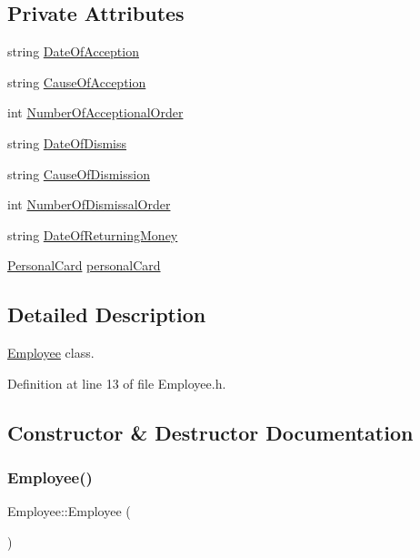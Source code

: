 \subsection*{Private Attributes}
\begin{DoxyCompactItemize}
\item 
string \hyperlink{class_employee_a4b6f93cebcc5e3bb343f89d65467c4d2}{Date\+Of\+Acception}
\item 
string \hyperlink{class_employee_ae218a1ea5ff298c3501afa8e815da9d7}{Cause\+Of\+Acception}
\item 
int \hyperlink{class_employee_aafefc3b0042fe3cf88dff13a6458e5de}{Number\+Of\+Acceptional\+Order}
\item 
string \hyperlink{class_employee_a1402b4d32163d3fca601082052d2ff80}{Date\+Of\+Dismiss}
\item 
string \hyperlink{class_employee_a80bd5a84291a0369521af1dcfecca970}{Cause\+Of\+Dismission}
\item 
int \hyperlink{class_employee_a0dc06d409299d253f240ceb01d1a3faf}{Number\+Of\+Dismissal\+Order}
\item 
string \hyperlink{class_employee_a05233437fad4de82175600c04552f0ca}{Date\+Of\+Returning\+Money}
\item 
\hyperlink{class_personal_card}{Personal\+Card} \hyperlink{class_employee_a3a0668e43e943ba0ac0ad0470de8599a}{personal\+Card}
\end{DoxyCompactItemize}


\subsection{Detailed Description}
\hyperlink{class_employee}{Employee} class. 

Definition at line 13 of file Employee.\+h.



\subsection{Constructor \& Destructor Documentation}
\mbox{\label{class_employee_a003c7bd08c40924e381eb0750cbb906f}} 
\subsubsection{\texorpdfstring{Employee()}{Employee()}}
{\footnotesize\ttfamily Employee\+::\+Employee (\begin{DoxyParamCaption}{ }\end{DoxyParamCaption})}



